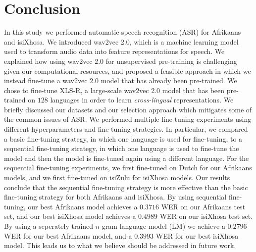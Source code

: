 \graphicspath{{conclusion/fig/}}

\chapter{Conclusion} \label{chap:conclusion}
In this study we performed automatic speech recognition (ASR) for Afrikaans and isiXhosa.
We introduced wav2vec 2.0, which is a machine learning model used to transform audio data into feature representations for speech.
We explained how using wav2vec 2.0 for unsupervised pre-training is challenging given our computational resources,
and proposed a feasible approach in which we instead fine-tune a wav2vec 2.0 model that has already been pre-trained.
We chose to fine-tune XLS-R, a large-scale wav2vec 2.0 model that has been pre-trained on $128$ languages in order to learn \emph{cross-lingual} representations.
We briefly discussed our datasets and our selection approach which mitigates some of the common issues of ASR.
We performed multiple fine-tuning experiments using different hyperparameters and fine-tuning strategies.
In particular, we compared a basic fine-tuning strategy, in which one language is used for fine-tuning, 
to a sequential fine-tuning strategy, in which one language is used to fine-tune the model and then the model is fine-tuned again using a different language.
For the sequential fine-tuning experiments, we first fine-tuned on Dutch for our Afrikaans models, and we first fine-tuned on isiZulu for isiXhosa models.
Our results conclude that the sequential fine-tuning strategy is more effective than the basic fine-tuning strategy for both Afrikaans and isiXhosa. 
By using sequential fine-tuning, our best Afrikaans model achieves a $0.3716$ WER on our Afrikaans test set, and our best isiXhosa model achieves a $0.4989$ WER on our isiXhosa test set.
By using a seperately trained $n$-gram language model (LM) we achieve a $0.2796$ WER for our best Afrikaans model, and a $0.3993$ WER for our best isiXhosa model.
This leads us to what we believe should be addressed in future work.

